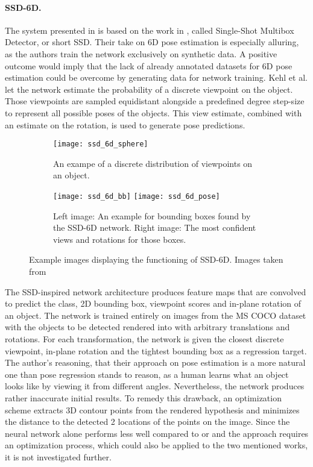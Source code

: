 \paragraph{SSD-6D.}

The system presented in \cite{ssd-6d} is based on the work in \cite{ssd}, called Single-Shot Multibox Detector, or short SSD. Their take on 6D pose estimation is especially alluring, as the authors train the network exclusively on synthetic data. A positive outcome would imply that the lack of already annotated datasets for 6D pose estimation could be overcome by generating data for network training. 
\nnewline
Kehl et al. let the network estimate the probability of a discrete viewpoint on the object. Those viewpoints are sampled equidistant alongside a predefined degree step-size to represent all possible poses of the objects. This view estimate, combined with an estimate on the rotation, is used to generate pose predictions. 
\nnewline
\begin{figure}[!tbp]
	\centering
	\begin{subfigure}[b]{0.3\textwidth}
		\centering
    	\texttt{[image: ssd\_6d\_sphere]}
    	\caption{An exampe of a discrete distribution of viewpoints on an object.}
	\end{subfigure}
	\hfill
	\begin{subfigure}[b]{0.6\textwidth}
		\centering
    	\texttt{[image: ssd\_6d\_bb]}
    	\texttt{[image: ssd\_6d\_pose]}
    	\caption{Left image: An example for bounding boxes found by the SSD-6D network. Right image: The most confident views and rotations for those boxes.}
	\end{subfigure}
	\caption{Example images displaying the functioning of SSD-6D. Images taken from \cite{ssd-6d}}
\end{figure}
The SSD-inspired network architecture produces feature maps that are convolved to predict the class, 2D bounding box, viewpoint scores and in-plane rotation of an object. The network is trained entirely on images from the MS COCO dataset \cite{mscoco} with the objects to be detected rendered into with arbitrary translations and rotations. For each transformation, the network is given the closest discrete viewpoint, in-plane rotation and the tightest bounding box as a regression target.
\nnewline
The author's reasoning, that their approach on pose estimation is a more natural one than pose regression stands to reason, as a human learns what an object looks like by viewing it from different angles. Nevertheless, the network produces rather inaccurate initial results.  To remedy this drawback, an optimization scheme extracts 3D contour points from the rendered hypothesis and minimizes the distance to the detected 2 locations of the points on the image. 
\nnewline
Since the neural network alone performs less well compared to \cite{brachmann1} or \cite{bb8} and the approach requires an optimization process, which could also be applied to the two mentioned works, it is not investigated further. 

